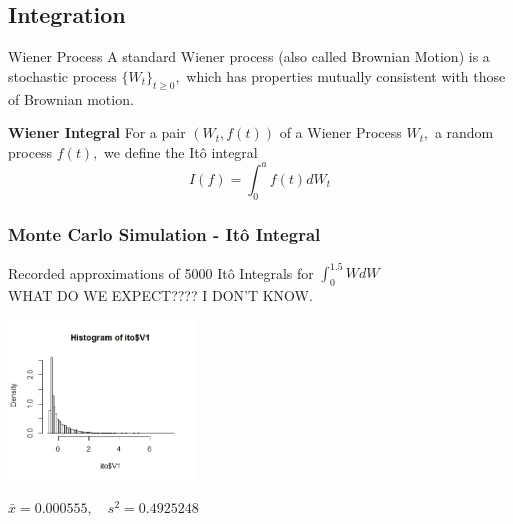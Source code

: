 \subsection{Integration}


\begin{frame}{Wiener Process}
A standard Wiener process (also called Brownian Motion) is a stochastic process $\{W_t\}_{t \geq 0},$ which has properties mutually consistent with those of Brownian motion.

\vfill

\textbf{Wiener Integral} For a pair $(W_t,f(t))$ of a Wiener Process $W_t,$ a random process $f(t),$ we define the It\^o integral 
	$$I(f)=\int_0^{a} f(t)dW_t$$
\end{frame}

\begin{frame}
   \frametitle{Monte Carlo Simulation - It\^o Integral}
	Recorded approximations of 5000 It\^o Integrals for $\int^{1.5}_{0} W dW$\\
	WHAT DO WE EXPECT???? I DON'T KNOW. \\
	\begin{center}
		\includegraphics[width=5cm]{img/ito}\\
	\end{center}
	\begin{center}
	$\bar{x}=0.000555,\hspace{1em} s^{2}=0.4925248$%

	\end{center} 
\end{frame}



